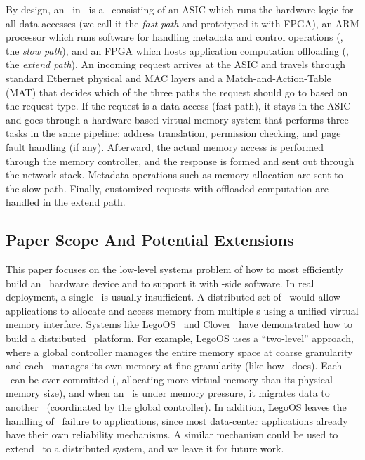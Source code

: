 By design, an \MN\ in \sys\ is a \sysboard\ consisting of an ASIC which runs the hardware logic for all data accesses (we call it the {\em fast path} and prototyped it with FPGA),
an ARM processor which runs software for handling metadata and control operations (\ie, the {\em slow path}),
and an FPGA which hosts application computation offloading (\ie, the {\em extend path}).
An incoming request arrives at the ASIC and travels through standard Ethernet physical and MAC layers 
and a Match-and-Action-Table (MAT) that decides which of the three paths the request should go to based on the request type.
If the request is a data access (fast path), it stays in the ASIC and goes through a hardware-based virtual memory system
that performs three tasks in the same pipeline: address translation, permission checking, and page fault handling (if any).
Afterward, the actual memory access is performed through the memory controller, and the response is formed and sent out through the network stack.
Metadata operations such as memory allocation are sent to the slow path. %
Finally, customized requests with %
offloaded computation are handled in the extend path.






\subsection{Paper Scope And Potential Extensions}
\label{sec:scope}
This paper focuses on the low-level systems problem of how to most efficiently build an \MN\ hardware device and to support it with \CN-side software. 
In real deployment, a single \sysboard\ is usually insufficient.
A distributed set of \sysboard\ would allow applications to allocate and access memory from multiple \MN{}s using a unified virtual memory interface. 
Systems like LegoOS~\cite{Shan18-OSDI} and Clover~\cite{Tsai20-ATC} have demonstrated how to build a distributed \MN\ platform.
For example, LegoOS uses a “two-level” approach, where a global controller manages the entire memory space at coarse granularity and each \MN\ manages its own memory at fine granularity (like how \sysboard\ does). Each \MN\ can be over-committed (\ie, allocating more virtual memory than its physical memory size), and when an \MN\ is under memory pressure, it migrates data to another \MN\ (coordinated by the global controller).
In addition, LegoOS leaves the handling of \MN\ failure to applications, since most data-center applications already have their own reliability mechanisms.
A similar mechanism could be used to extend \sys\ to a distributed system, and we leave it for future work.

